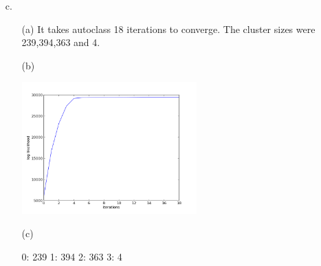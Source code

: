 \documentclass[12pt]{amsart}
\theoremstyle{remark}
\begin{document}
\begin{enumerate}

\item[c.]
\begin{enumerate}
\item[(a)]
It takes autoclass 18 iterations to converge.
The cluster sizes were 239,394,363 and 4.

\item[(b)]

\includegraphics[height=2in]{log-likelihood.png}

\item[(c)]

0: 239
1: 394
2: 363
3: 4

\end{enumerate}

\end{enumerate}
\end{document}
